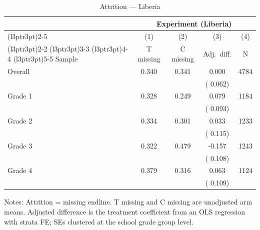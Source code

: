 \begin{table}[H]
\centering
\caption{Attrition --- Liberia}
\label{tab:lib_attrition}
\begin{threeparttable}
\begin{tabular}[t]{lcccc}
\toprule
\multicolumn{1}{c}{ } & \multicolumn{4}{c}{Experiment (Liberia)} \\
\cmidrule(l{3pt}r{3pt}){2-5}
\multicolumn{1}{c}{ } & \multicolumn{1}{c}{(1)} & \multicolumn{1}{c}{(2)} & \multicolumn{1}{c}{(3)} & \multicolumn{1}{c}{(4)} \\
\cmidrule(l{3pt}r{3pt}){2-2} \cmidrule(l{3pt}r{3pt}){3-3} \cmidrule(l{3pt}r{3pt}){4-4} \cmidrule(l{3pt}r{3pt}){5-5}
Sample & T missing & C missing & Adj.\ diff. & N \\
\midrule
Overall & 0.340 & 0.341 &   0.000 & 4784 \\
 & & & (  0.062) & \\
Grade 1 & 0.328 & 0.249 &   0.079 & 1184 \\
 & & & (  0.093) & \\
Grade 2 & 0.334 & 0.301 &   0.033 & 1233 \\
 & & & (  0.115) & \\
Grade 3 & 0.322 & 0.479 &  -0.157 & 1243 \\
 & & & (  0.108) & \\
Grade 4 & 0.379 & 0.316 &   0.063 & 1124 \\
 & & & (  0.109) & \\
\bottomrule
\end{tabular}
\begin{tablenotes}[para]
\item Notes: Attrition = missing endline. T missing and C missing are unadjusted arm means. Adjusted difference is the treatment coefficient from an OLS regression with strata FE; SEs clustered at the school grade group level.
\end{tablenotes}
\end{threeparttable}
\end{table}
